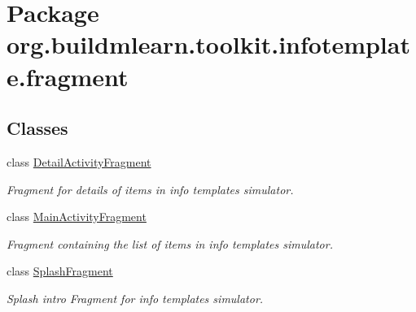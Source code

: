 \hypertarget{namespaceorg_1_1buildmlearn_1_1toolkit_1_1infotemplate_1_1fragment}{}\section{Package org.\+buildmlearn.\+toolkit.\+infotemplate.\+fragment}
\label{namespaceorg_1_1buildmlearn_1_1toolkit_1_1infotemplate_1_1fragment}
\subsection*{Classes}
\begin{DoxyCompactItemize}
\item 
class \hyperlink{classorg_1_1buildmlearn_1_1toolkit_1_1infotemplate_1_1fragment_1_1DetailActivityFragment}{Detail\+Activity\+Fragment}
\begin{DoxyCompactList}\small\item\em Fragment for details of items in info template\textquotesingle{}s simulator. \end{DoxyCompactList}\item 
class \hyperlink{classorg_1_1buildmlearn_1_1toolkit_1_1infotemplate_1_1fragment_1_1MainActivityFragment}{Main\+Activity\+Fragment}
\begin{DoxyCompactList}\small\item\em Fragment containing the list of items in info template\textquotesingle{}s simulator. \end{DoxyCompactList}\item 
class \hyperlink{classorg_1_1buildmlearn_1_1toolkit_1_1infotemplate_1_1fragment_1_1SplashFragment}{Splash\+Fragment}
\begin{DoxyCompactList}\small\item\em Splash intro Fragment for info template\textquotesingle{}s simulator. \end{DoxyCompactList}\end{DoxyCompactItemize}
